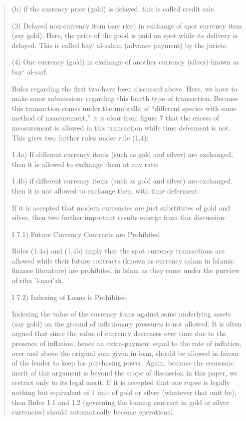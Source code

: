 \begin{quote}
(b) if the currency price (gold) is delayed, this is called credit sale.

(3) Delayed non-currency item (say rice) in exchange of spot currency item (say gold). Here, the price of the good is paid on spot while its delivery is delayed. This is called bay‘ al-salam (advance payment) by the jurists.

(4) One currency (gold) in exchange of another currency (silver)-known as bay‘ al-sarf.

Rules regarding the first two have been discussed above. Here, we have to make some submissions regarding this fourth type of transaction. Because this transaction comes under the umbrella of “different species with same method of measurement,” it is clear from figure 7 that the excess of measurement is allowed in this transaction while time deferment is not. This gives two further rules under rule (1.4):

1.4a) If different currency items (such as gold and silver) are exchanged, then it is allowed to exchange them at any rate;

1.4b) if different currency items (such as gold and silver) are exchanged, then it is not allowed to exchange them with time deferment.

If it is accepted that modern currencies are just substitutes of gold and silver, then two further important results emerge from this discussion:

I 7.1) Future Currency Contracts are Prohibited

Rules (1.4a) and (1.4b) imply that the spot currency transactions are allowed while their future contracts (known as currency salam in Islamic finance literature) are prohibited in Islam as they come under the purview of riba 'l-nasi'ah.

I 7.2) Indexing of Loans is Prohibited

Indexing the value of the currency loans against some underlying assets (say gold) on the ground of inflationary pressures is not allowed. It is often argued that since the value of currency decreases over time due to the presence of inflation, hence an extra-payment equal to the rate of inflation, over and above the original sum given in loan, should be allowed in favour of the lender to keep his purchasing power. Again, because the economic merit of this argument is beyond the scope of discussion in this paper, we restrict only to its legal merit. If it is accepted that one rupee is legally nothing but equivalent of 1 unit of gold or silver (whatever that unit be), then Rules 1.1 and 1.2 (governing the loaning contract in gold or silver currencies) should automatically become operational.


\end{quote}
